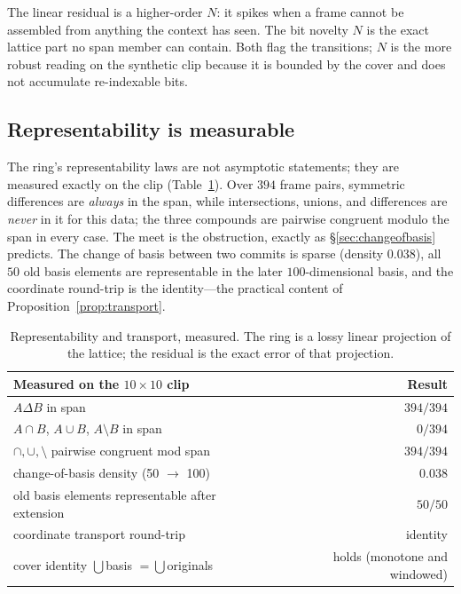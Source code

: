 \documentclass[11pt,a4paper]{article}
\theoremstyle{remark}
\newcommand{\xor}{\ensuremath{\Delta}}                %
\begin{document}
The linear residual is a higher-order $N$: it spikes when a frame cannot be
assembled from anything the context has seen. The bit novelty $N$ is the exact
lattice part no span member can contain. Both flag the transitions; $N$ is the
more robust reading on the synthetic clip because it is bounded by the cover and
does not accumulate re-indexable bits.

\subsection{Representability is measurable}

The ring's representability laws are not asymptotic statements; they are
measured exactly on the clip (Table~\ref{tab:repr}). Over $394$ frame pairs,
symmetric differences are \emph{always} in the span, while intersections,
unions, and differences are \emph{never} in it for this data; the three
compounds are pairwise congruent modulo the span in every case. The meet is the
obstruction, exactly as \S\ref{sec:changeofbasis} predicts. The change of basis
between two commits is sparse (density $0.038$), all $50$ old basis elements are
representable in the later $100$-dimensional basis, and the coordinate
round-trip is the identity---the practical content of
Proposition~\ref{prop:transport}.

\begin{table}[t]
\centering
\small
\begin{tabular}{@{}lr@{}}
\toprule
Measured on the $10\times10$ clip & Result \\
\midrule
$A\xor B$ in span & $394/394$ \\
$A\cap B$, $A\cup B$, $A\setminus B$ in span & $0/394$ \\
$\cap,\cup,\setminus$ pairwise congruent mod span & $394/394$ \\
change-of-basis density (50 $\to$ 100) & $0.038$ \\
old basis elements representable after extension & $50/50$ \\
coordinate transport round-trip & identity \\
cover identity $\bigcup$basis $=\bigcup$originals & holds (monotone and windowed) \\
\bottomrule
\end{tabular}
\caption{Representability and transport, measured. The ring is a lossy linear
projection of the lattice; the residual is the exact error of that projection.}
\label{tab:repr}
\end{table}
\end{document}
